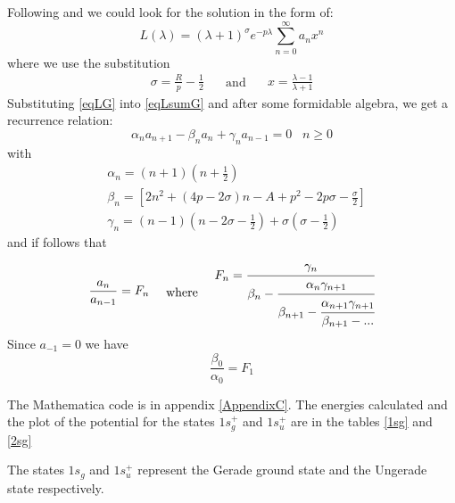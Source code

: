 Following \cite{Bates1} and \cite{H2Plus2d2} we could look for the solution in the form of:
\begin{equation}\label{eqLsumG}
L(\lambda) = \left(\lambda +1\right)^\sigma e^{-p\lambda}\sum_{n=0}^{\infty}{a_nx^n}
\end{equation}
where we use the substitution
\begin{equation}\label{eqLG}
\begin{split}
\sigma = \frac{R}{p} - \frac{1}{2}
\end{split}
\quad\text{ and }\quad
\begin{split}
x = \frac{\lambda-1}{\lambda+1}
\end{split}
\end{equation}
Substituting \eqref{eqLG} into \eqref{eqLsumG} and after some formidable algebra, we get a recurrence relation:
\begin{equation}
\alpha_na_{n+1}-\beta_n a_n+\gamma_na_{n-1} = 0\,\,\,\,\,n \ge 0
\end{equation}
with
\begin{equation}
\begin{split}
& \alpha_n = \left(n + 1\right)\left(n + \frac{1}{2}\right)\\[.8em]
& \beta_n = \left[2n^2 + (4p - 2\sigma)n - A + p^2 - 2p\sigma - \frac{\sigma}{2}\right] \\[.8em]
& \gamma_n = (n-1)\left(n - 2\sigma - \frac{1}{2}\right) + \sigma\left(\sigma - \frac{1}{2}\right)
\end{split}
\end{equation}
and if follows that
\begin{equation}
\begin{split}
\frac{a_n}{a_{n-1}} = F_n
\end{split}
\quad\text{ where }\quad
\begin{split}
F_n = \cfrac{\gamma_n}{\beta_n - \cfrac{\alpha_n \gamma_{n+1}}{\beta_{n+1}-\cfrac{\alpha_{n+1}\gamma_{n+1}}{\beta_{n+1}-\text{...}}}}
\end{split}
\end{equation}
Since $ a_{-1} = 0$ we have
\begin{equation}
\frac{\beta_0}{\alpha_0} = F_1
\end{equation}

The Mathematica code is in appendix \ref{AppendixC}. The energies calculated and the plot of the potential for the states $1s_g^{+}$ and $ 1s_u^{+} $ are in the tables \ref{1sg} and \ref{2sg}

The states  $ 1s_g $ and $ 1s_u^{+} $ represent the Gerade ground state and the Ungerade state respectively.

